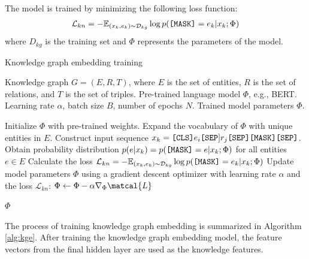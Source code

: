 The model is trained by minimizing the following loss function:
\begin{align}
\mathcal{L}_{kn} = - \mathbb{E}_{(x_k,e_k) \sim \mathcal{D}_{kg}}\log{p(\text{\texttt{[MASK]}} = e_k|x_k;\Phi)}
\end{align}
where $D_{kg}$ is the training set and $\Phi$ represents the parameters of the model.
\begin{algorithm}[hbt]
\caption{Knowledge graph embedding training}\label{alg:kge}
\begin{algorithmic}[1]
\REQUIRE Knowledge graph $G = (E, R, T)$, where $E$ is the set of entities, $R$ is the set of relations, and $T$ is the set of triples.
\REQUIRE Pre-trained language model $\Phi$, e.g., BERT.
\REQUIRE Learning rate $\alpha$, batch size $B$, number of epochs $N$.
\ENSURE Trained model parameters $\Phi$.

\STATE Initialize $\Phi$ with pre-trained weights.
\STATE Expand the vocabulary of $\Phi$ with unique entities in $E$.
        \STATE Construct input sequence $x_k = \text{\texttt{[CLS]}} e_i \text{\texttt{[SEP}]} r_j \text{\texttt{[SEP]}} \text{\texttt{[MASK]}} \text{\texttt{[SEP]}}$.
        \STATE Obtain probability distribution $p(e|x_k) = p(\text{\texttt{[MASK]}} = e|x_k;\Phi)$ for all entities $e \in E$
        \STATE Calculate the loss $\mathcal{L}_{kn} = - \mathbb{E}_{(x_k,e_k) \sim \mathcal{D}_{kg}}\log{p(\text{\texttt{[MASK]}} = e_k|x_k;\Phi)}$
        \STATE Update model parameters $\Phi$ using a gradient descent optimizer with learning rate $\alpha$ and the loss $\mathcal{L}_{kn}$: $\Phi \leftarrow \Phi - \alpha \nabla_\Phi\matcal{L}$
    \ENDFOR
\ENDFOR

\RETURN $\Phi$
\end{algorithmic}
\end{algorithm}
The process of training knowledge graph embedding is summarized in Algorithm \ref{alg:kge}. After training the knowledge graph embedding model, the feature vectors from the final hidden layer are used as the knowledge features.

